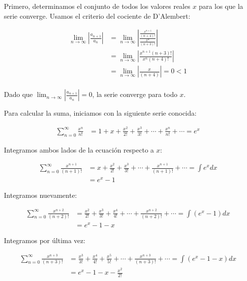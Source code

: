 \documentclass{article}
\begin{document}
    Primero, determinamos el conjunto de todos los valores reales $x$ para los que la serie converge. Usamos el criterio del cociente de D'Alembert:

    \begin{align*}
    \lim _{n \rightarrow \infty}\left|\frac{a_{n+1}}{a_{n}}\right| &= \lim _{n \rightarrow \infty}\left|\frac{\frac{x^{n+1}}{(n+4)!}}{\frac{x^{n}}{(n+3)!}}\right| \\
    &= \lim _{n \rightarrow \infty}\left|\frac{x^{n+1}(n+3)!}{x^{n}(n+4)!}\right| \\
    &= \lim _{n \rightarrow \infty}\left|\frac{x}{(n+4)}\right|= 0 < 1 \\
    \end{align*}

    Dado que \(\lim _{n \rightarrow \infty}\left|\frac{a_{n+1}}{a_{n}}\right|=0\), la serie converge para todo $x$.

    Para calcular la suma, iniciamos con la siguiente serie conocida:

    \begin{align*}
    \sum_{n=0}^{\infty} \frac{x^{n}}{n!} &= 1 + x + \frac{x^{2}}{2!} + \frac{x^{3}}{3!} + \cdots + \frac{x^{n}}{n!} + \cdots = e^{x}
    \end{align*}

    Integramos ambos lados de la ecuación respecto a $x$:

    \begin{align*}
    \sum_{n=0}^{\infty} \frac{x^{n+1}}{(n+1)!} &= x + \frac{x^{2}}{2!} + \frac{x^{3}}{3!} + \cdots + \frac{x^{n+1}}{(n+1)!} + \cdots = \int e^{x} dx \\
    &= e^{x} - 1
    \end{align*}

    Integramos nuevamente:

    \begin{align*}
    \sum_{n=0}^{\infty} \frac{x^{n+2}}{(n+2)!} &= \frac{x^{2}}{2!} + \frac{x^{3}}{3!} + \frac{x^{4}}{4!} + \cdots + \frac{x^{n+2}}{(n+2)!} + \cdots = \int (e^{x} - 1) dx \\
    &= e^{x} - 1 - x
    \end{align*}

    Integramos por última vez:

    \begin{align*}
    \sum_{n=0}^{\infty} \frac{x^{n+3}}{(n+3)!} &= \frac{x^{3}}{3!} + \frac{x^{4}}{4!} + \frac{x^{5}}{5!} + \cdots + \frac{x^{n+3}}{(n+3)!} + \cdots = \int (e^{x} - 1 - x) dx \\
    &= e^{x} - 1 - x - \frac{x^{2}}{2!}
    \end{align*}
\end{document}
